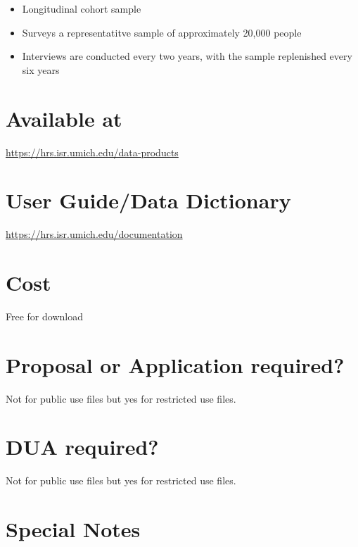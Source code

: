 \documentclass[
]{book}
\providecommand{\tightlist}{%
  \setlength{\itemsep}{0pt}\setlength{\parskip}{0pt}}
\begin{document}
\begin{itemize}
\tightlist
\item
  Longitudinal cohort sample
\item
  Surveys a representatitve sample of approximately 20,000 people
\item
  Interviews are conducted every two years, with the sample replenished every six years
\end{itemize}

\hypertarget{available-at-30}{%
\section{Available at}\label{available-at-30}}

\url{https://hrs.isr.umich.edu/data-products}

\hypertarget{user-guidedata-dictionary-30}{%
\section{User Guide/Data Dictionary}\label{user-guidedata-dictionary-30}}

\url{https://hrs.isr.umich.edu/documentation}

\hypertarget{cost-30}{%
\section{Cost}\label{cost-30}}

Free for download

\hypertarget{proposal-or-application-required-30}{%
\section{Proposal or Application required?}\label{proposal-or-application-required-30}}

Not for public use files but yes for restricted use files.

\hypertarget{dua-required-30}{%
\section{DUA required?}\label{dua-required-30}}

Not for public use files but yes for restricted use files.

\hypertarget{special-notes-30}{%
\section{Special Notes}\label{special-notes-30}}
\end{document}
